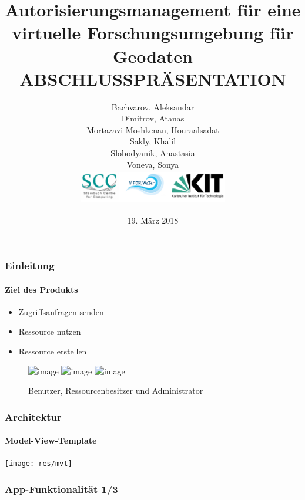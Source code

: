 \documentclass{beamer}
\title[Autorisierungsmanagement für eine virtuelle
Forschungsumgebung für Geodaten: Abschlusspräsentation]{Autorisierungsmanagement für eine virtuelle
Forschungsumgebung für Geodaten \\ \textbf{ABSCHLUSSPRÄSENTATION}} %
\author[]{
Bachvarov, Aleksandar\\
Dimitrov, Atanas\\
Mortazavi Moshkenan, Houraalsadat\\
Sakly, Khalil\\
Slobodyanik, Anastasia\\
Voneva, Sonya\\ \vspace{.75cm}
	\includegraphics[width=6.5cm, height=1.5cm]{res/logos} 
}
\date{19. März 2018} %
\begin{document}
\begin{frame}[plain]
\titlepage %
\end{frame}




\begin{frame}
\frametitle{Einleitung}
\framesubtitle{Ziel des Produkts}

\begin{itemize}
	\item<1-7> Zugriffsanfragen senden
	\item<2-7> Ressource nutzen
	\item<3-7> Ressource erstellen
\end{itemize}
	\begin{figure}
		
			\includegraphics<4-7>[height=2cm,width=2cm]{res/benutzer}
			\hspace{0.2cm}
			\includegraphics<5-7>[height=2cm,width=2cm]{res/ressbesitzer}
			\hspace{0.2cm}
			\includegraphics<6-7>[height=2cm,width=2cm]{res/admin}	
			\item<7>Benutzer, Ressourcenbesitzer und Administrator
			
	\end{figure}

\end{frame}
\begin{frame}

\frametitle{Architektur}
\framesubtitle{Model-View-Template}
\vspace{1cm}
\texttt{[image: res/mvt]}

\end{frame}
\begin{frame}
\frametitle{App-Funktionalität 1/3}
\begin{center}

\end{center}\end{frame}
\end{document}
